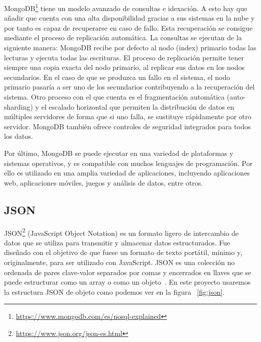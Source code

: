 \documentclass[a4paper, 12pt]{book}
\begin{document}
MongoDB\footnote{\url{https://www.mongodb.com/es/nosql-explained}} tiene un modelo avanzado de consultas e idexación.               
A esto hay que añadir que cuenta con una alta disponibilidad gracias a sus sistemas en la nube y por tanto es capaz de recuperarse en caso de fallo. 
Esta recuperación se consigue mediante el proceso de replicación automática.
La consultas se ejecutan de la siguiente manera: MongoDB recibe por defecto al nodo (index) primario todas las lecturas y ejecuta todas las escrituras.
El proceso de replicación permite tener siempre una copia exacta del nodo primario, al replicar sus datos en los nodos secundarios.
En el caso de que se produzca un fallo en el sistema, el nodo primario pasaría a ser uno de los secundarios contribuyendo a la recuperación del sistema. 
Otro proceso con el que cuenta es el fragmentación automática (auto-sharding) y el escalado horizontal que permiten la distribución de datos en múltiples servidores de forma que si uno falla, se sustituye rápidamente por otro servidor.
MongoDB también ofrece controles de seguridad integrados para todos los datos.


Por último, MongoDB se puede ejecutar en una variedad de plataformas y sistemas operativos, y es compatible con muchos lenguajes de programación.
Por ello es utilizado en una amplia variedad de aplicaciones, incluyendo aplicaciones web, aplicaciones móviles, juegos y análisis de datos, entre otros.


\subsection{JSON} %
\label{sec:json} %

JSON\footnote{\url{https://www.json.org/json-es.html}} (JavaScript Object Notation) es un formato ligero de intercambio de datos que se utiliza para transmitir y almacenar datos estructurados. 
Fue diseñado con el objetivo de que fuese un formato de texto portátil, mínimo y, originalmente, para ser utilizado con JavaScript. 
JSON es una colección no ordenada de pares clave-valor separados por comas y encerrados en llaves que se puede estructurar como un array o como un objeto~\cite{bray2014javascript}. 
En este proyecto usaremos la estructura JSON de objeto como podemos ver en la figura ~\ref{fig:json}. 
\end{document}
